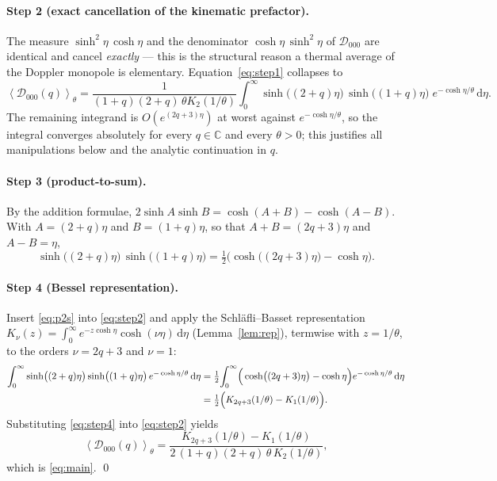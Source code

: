 \documentclass[11pt]{article}
\theoremstyle{definition}
\theoremstyle{remark}
\newcommand{\dd}{\mathrm{d}}
\newcommand{\Do}{\mathcal{D}}
\newcommand{\avg}[1]{\left\langle #1 \right\rangle}
\newcommand{\Cx}{\mathbb{C}}
\begin{document}
\paragraph{Step 2 (exact cancellation of the kinematic prefactor).}
The measure $\sinh^2\eta\,\cosh\eta$ and the denominator $\cosh\eta\,\sinh^2\eta$ of $\Do_{000}$ are identical and
cancel \emph{exactly} --- this is the structural reason a thermal average of the Doppler monopole is elementary.
Equation~\eqref{eq:step1} collapses to
\begin{equation}
  \avg{\Do_{000}(q)}_\theta
  =\frac{1}{(1+q)(2+q)\,\theta K_2(1/\theta)}
     \int_0^\infty \sinh\!\big((2+q)\eta\big)\,\sinh\!\big((1+q)\eta\big)\;e^{-\cosh\eta/\theta}\,\dd\eta .
  \label{eq:step2}
\end{equation}
The remaining integrand is $O(e^{(2q+3)\eta})$ at worst against $e^{-\cosh\eta/\theta}$, so the integral converges
absolutely for every $q\in\Cx$ and every $\theta>0$; this justifies all manipulations below and the analytic
continuation in $q$.

\paragraph{Step 3 (product-to-sum).}
By the addition formulae, $2\sinh A\sinh B=\cosh(A+B)-\cosh(A-B)$. With $A=(2+q)\eta$ and $B=(1+q)\eta$, so that
$A+B=(2q+3)\eta$ and $A-B=\eta$,
\begin{equation}
  \sinh\!\big((2+q)\eta\big)\,\sinh\!\big((1+q)\eta\big)
  =\tfrac12\Big(\cosh\!\big((2q+3)\eta\big)-\cosh\eta\Big).
  \label{eq:p2s}
\end{equation}

\paragraph{Step 4 (Bessel representation).}
Insert \eqref{eq:p2s} into \eqref{eq:step2} and apply the Schl\"afli--Basset representation
$K_\nu(z)=\int_0^\infty e^{-z\cosh\eta}\cosh(\nu\eta)\,\dd\eta$ (Lemma~\ref{lem:rep}), termwise with $z=1/\theta$,
to the orders $\nu=2q+3$ and $\nu=1$:
\begin{align}
  \int_0^\infty \sinh\!\big((2+q)\eta\big)\sinh\!\big((1+q)\eta\big)\,e^{-\cosh\eta/\theta}\,\dd\eta
  &=\tfrac12\!\int_0^\infty\!\Big(\cosh\!\big((2q+3)\eta\big)-\cosh\eta\Big)e^{-\cosh\eta/\theta}\,\dd\eta\notag\\
  &=\tfrac12\Big(K_{2q+3}(1/\theta)-K_1(1/\theta)\Big).
  \label{eq:step4}
\end{align}
Substituting \eqref{eq:step4} into \eqref{eq:step2} yields
\begin{equation}
  \avg{\Do_{000}(q)}_\theta
  =\frac{K_{2q+3}(1/\theta)-K_1(1/\theta)}{2\,(1+q)(2+q)\,\theta\,K_2(1/\theta)},
\end{equation}
which is \eqref{eq:main}. \qed
\end{document}
